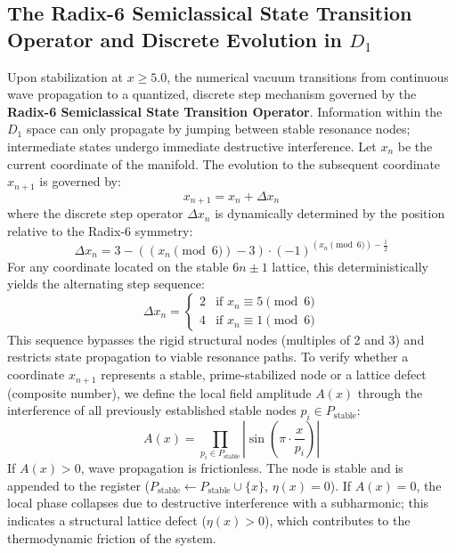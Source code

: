 \documentclass[11pt,a4paper]{article}
\theoremstyle{plain}
\theoremstyle{definition}
\theoremstyle{remark}
\begin{document}
\newpage
\subsection{The Radix-6 Semiclassical State Transition Operator and Discrete Evolution in $D_1$}
Upon stabilization at $x \ge 5.0$, the numerical vacuum transitions from continuous wave propagation to a quantized, discrete step mechanism governed by the \textbf{Radix-6 Semiclassical State Transition Operator}. Information within the $D_1$ space can only propagate by jumping between stable resonance nodes; intermediate states undergo immediate destructive interference. Let $x_n$ be the current coordinate of the manifold. The evolution to the subsequent coordinate $x_{n+1}$ is governed by:
\begin{equation}
x_{n+1} = x_n + \Delta x_n
\end{equation}
where the discrete step operator $\Delta x_n$ is dynamically determined by the position relative to the Radix-6 symmetry:
\begin{equation}
\Delta x_n = 3 - ((x_n \pmod 6) - 3) \cdot (-1)^{(x_n \pmod 6) - \frac{1}{2}}
\end{equation}
For any coordinate located on the stable $6n \pm 1$ lattice, this deterministically yields the alternating step sequence:
\begin{equation}
\Delta x_n = \begin{cases} 2 & \text{if } x_n \equiv 5 \pmod 6 \\ 4 & \text{if } x_n \equiv 1 \pmod 6 \end{cases}
\end{equation}
This sequence bypasses the rigid structural nodes (multiples of 2 and 3) and restricts state propagation to viable resonance paths. To verify whether a coordinate $x_{n+1}$ represents a stable, prime-stabilized node or a lattice defect (composite number), we define the local field amplitude $A(x)$ through the interference of all previously established stable nodes $p_i \in P_{\text{stable}}$:
\begin{equation}
A(x) = \prod_{p_i \in P_{\text{stable}}} \left| \sin\left(\pi \cdot \frac{x}{p_i}\right) \right|
\end{equation}
If $A(x) > 0$, wave propagation is frictionless. The node is stable and is appended to the register ($P_{\text{stable}} \leftarrow P_{\text{stable}} \cup \{x\}$, $\eta(x)=0$). If $A(x) = 0$, the local phase collapses due to destructive interference with a subharmonic; this indicates a structural lattice defect ($\eta(x) > 0$), which contributes to the thermodynamic friction of the system.
\end{document}
